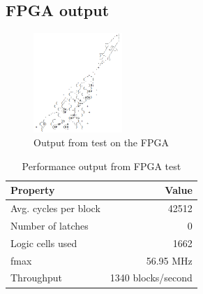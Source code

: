 \subsection{FPGA output}
\begin{figure}
    \centering
    \includegraphics[width=0.3\textwidth]{images/rocket}
    \caption{Output from test on the FPGA}
    \label{fig:rocket}
\end{figure}
%
\begin{table}[htp]
    \begin{center}
        \begin{tabular}{l | r}
            Property              & Value              \\
            \hline
            Avg. cycles per block & 42512              \\
            Number of latches     & 0                  \\
            Logic cells used      & 1662               \\
            fmax                  & 56.95 MHz          \\
            Throughput            & 1340 blocks/second \\
        \end{tabular}
        \caption{Performance output from FPGA test}
        \label{tab:fpga_performance}
    \end{center}
\end{table}

